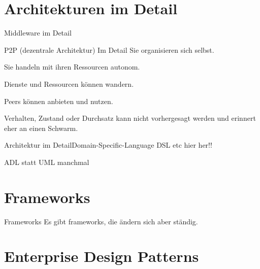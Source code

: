\documentclass{beamer}
\begin{document}
\section{Architekturen im Detail}

\begin{frame}
		Middleware im Detail

		P2P (dezentrale Architektur) Im Detail
		    Sie organisieren sich selbst.

    Sie handeln mit ihren Ressourcen autonom.

    Dienste und Ressourcen können wandern.

    Peers können anbieten und nutzen.

    Verhalten, Zustand oder Durchsatz kann nicht vorhergesagt werden und erinnert eher an einen Schwarm.
\end{frame}

\begin{frame}{Architektur im Detail}{Domain-Specific-Language}
	DSL etc hier her!!
\end{frame}

\begin{frame}
	ADL statt UML manchmal
\end{frame}

\section{Frameworks}

\begin{frame}{Frameworks}
	Es gibt frameworks, die ändern sich aber ständig.
\end{frame}

\section{Enterprise Design Patterns}

\begin{frame}
\end{frame}






\end{document}
